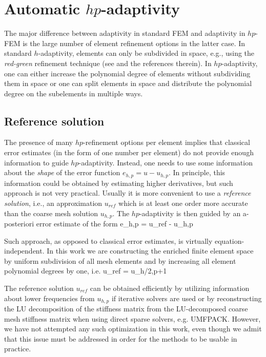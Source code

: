 \section{Automatic $hp$-adaptivity}

The major difference between adaptivity in standard FEM and adaptivity
in $hp$-FEM is the large number of element refinement options in the
latter case. In standard $h$-adaptivity, elements can only be subdivided in space,
e.g., using the {\em red-green} refinement technique (see \cite{aksoylu} and the
references therein). In $hp$-adaptivity, one can either increase the polynomial
degree of elements without subdividing them in space or one can split elements
in space and distribute the polynomial degree on the subelements in multiple ways.

\subsection{Reference solution}

The presence of many $hp$-refinement options per element implies that
classical error estimates (in the form of one number per element)
do not provide enough information to guide $hp$-adaptivity. Instead,
one needs to use some information about the {\em shape} of
the error function $e_{h,p} = u - u_{h,p}$. In principle, this information
could be obtained by estimating higher derivatives, but such approach
is not very practical. Usually it is more convenient to use
a {\em reference solution}, i.e., an approximation $u_{ref}$ which is
at least one order more accurate than the coarse mesh solution $u_{h,p}$.
The $hp$-adaptivity is then guided by an a-posteriori error estimate
of the form
\be\label{errest}
e_{h,p} = u_{ref} - u_{h,p}
\ee

Such approach, as opposed to classical error estimates, is virtually
equation-independent. In this work we are constructing the enriched
finite element space by uniform subdivision of all mesh elements and 
by increasing all element polynomial degrees by one, i.e.
\bd
  u_{ref} = u_{h/2,p+1}
\ed

The reference solution $u_{ref}$ can be obtained efficiently by
utilizing information about lower frequencies from $u_{h,p}$
\cite{demk1,SoDe,solin1} if iterative solvers are used or by 
reconstructing the LU decomposition of the stiffness matrix
from the LU-decomposed coarse mesh stiffness matrix when using
direct sparse solvers, e.g. UMFPACK. However, we have not
attempted any such optimization in this work, even though we
admit that this issue must be addressed in order for the methods
to be usable in practice.


